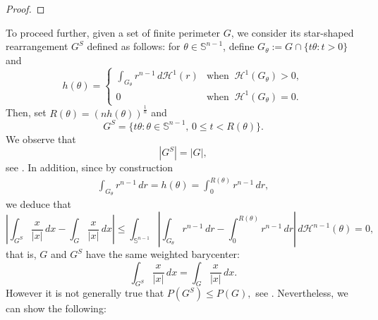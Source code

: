 \documentclass[reqno,11pt]{amsart}
\numberwithin{equation}{section}
\theoremstyle{remark}
\begin{document}
\begin{proof}
\end{proof}


To proceed further, given a set of finite perimeter $G$, we consider its star-shaped rearrangement $G^S$ defined as follows: for $\theta\in \mathbb S^{n-1}$, define $G_\theta:= G\cap \{t\theta\colon t>0 \}$
and 
$$h(\theta)=
\left\{
\begin{array}{cc}
\int_{G_\theta} r^{n-1}\, d\mathscr H^1(r) & \text{when } \ \mathscr H^{1}(G_\theta)>0, \\
0 & \text{when } \ \mathscr H^{1}(G_\theta)=0.
\end{array}
\right.
$$
Then, set $R(\theta)= (n h(\theta))^{\frac 1 n}$ and 
$$G^S=\{t\theta\colon \theta\in \mathbb S^{n-1},\,0\leq t<R(\theta)\}. $$
We observe that 
\begin{equation}
\label{eq:vol G GS}
|G^S|=|G|,
\end{equation}
see \cite{K1985, K1986}. 
In addition, since by construction
\begin{align*}
\int_{G_\theta} r^{n-1}\,dr= h(\theta)=\int_0^{R(\theta)} r^{n-1}\, dr,
\end{align*}
we deduce that 
$$
 \left|\int_{G^S} \frac{x}{|x|}\, dx - \int_{G} \frac{x}{|x|}\, dx\right| 
\le \int_{\mathbb S^{n-1}} \left|\int_{G_\theta} r^{n-1}\,dr - \int_0^{R(\theta)} r^{n-1}\, dr\right|\, d\mathscr H^{n-1}(\theta)=0,
$$
that is, $G$ and $G^S$ have the same weighted barycenter:
\begin{equation}
\label{eq:bar G GS}
\int_{G^S} \frac{x}{|x|}\, dx =\int_{G} \frac{x}{|x|}\, dx.
\end{equation}
However it is not generally true that 
$P(G^S)\le P(G),$
see \cite[Lemma 1.2]{K1986}.
Nevertheless, we can show the following: 
\end{document}
